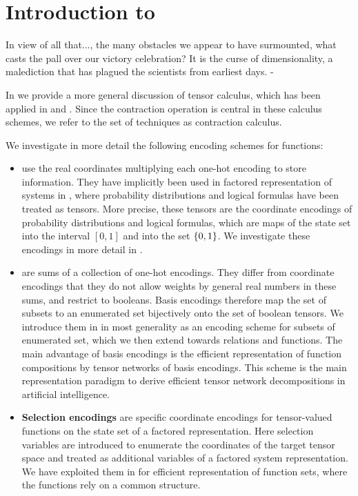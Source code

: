 \chapter{Introduction to }

\begin{highlight}
    In view of all that..., the many obstacles we appear to have surmounted, what casts the pall over our victory celebration?
    It is the curse of dimensionality, a malediction that has plagued the scientists from earliest days. - 
\end{highlight}

In  we provide a more general discussion of tensor calculus, which has been applied in  and .
Since the contraction operation is central in these calculus schemes, we refer to the set of techniques as contraction calculus.


We investigate in more detail the following encoding schemes for functions:
\begin{itemize}
    \item \textbf{\coordinateEncodings{}} use the real coordinates multiplying each one-hot encoding to store information.
    They have implicitly been used in factored representation of systems in , where probability distributions and logical formulas have been treated as tensors.
    More precise, these tensors are the coordinate encodings of probability distributions and logical formulas, which are maps of the state set into the interval $[0,1]$ and into the set $\{0,1\}$.
    We investigate these encodings in more detail in .
    \item \textbf{\basisEncodings{}} are sums of a collection of one-hot encodings.
    They differ from coordinate encodings that they do not allow weights by general real numbers in these sums, and restrict to booleans.
    Basis encodings therefore map the set of subsets to an enumerated set bijectively onto the set of boolean tensors.
    We introduce them in  in most generality as an encoding scheme for subsets of enumerated set, which we then extend towards relations and functions.
    The main advantage of basis encodings is the efficient representation of function compositions by tensor networks of basis encodings.
    This scheme is the main representation paradigm to derive efficient tensor network decompositions in artificial intelligence.
    \item \textbf{Selection encodings} are specific coordinate encodings for tensor-valued functions on the state set of a factored representation.
    Here selection variables are introduced to enumerate the coordinates of the target tensor space and treated as additional variables of a factored system representation.
    We have exploited them in  for efficient representation of function sets, where the functions rely on a common structure.
\end{itemize}


